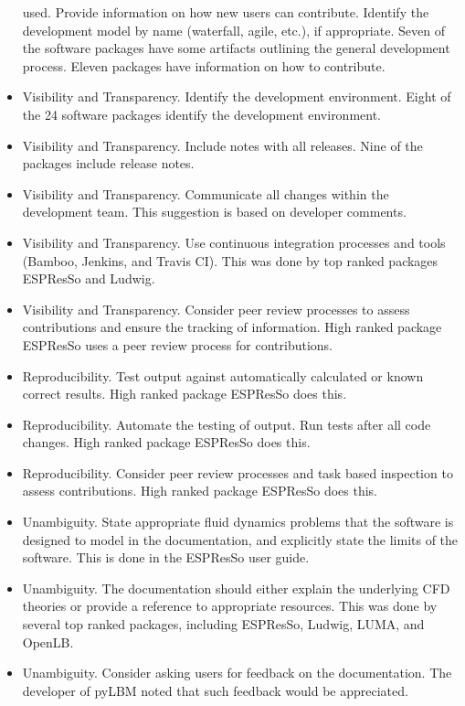 \documentclass[final, 3p, times, authoryear]{elsarticle}
\begin{document}
\begin{itemize}
	used. Provide information on how new users can contribute. Identify the
	development model by name (waterfall, agile, etc.), if appropriate.  Seven
	of the software packages have some artifacts outlining the general
	development process. Eleven packages have information on how to contribute. 
	\item Visibility and Transparency. Identify the development environment.
	Eight of the 24 software packages identify the development environment.
	\item Visibility and Transparency. Include notes with all releases. Nine of
	the packages include release notes.
	\item Visibility and Transparency. Communicate all changes within the
	development team. This suggestion is based on developer comments.
	\item Visibility and Transparency. Use continuous integration processes and
	tools (Bamboo, Jenkins, and Travis CI). This was done by top ranked packages
	ESPResSo and Ludwig.
	\item Visibility and Transparency. Consider peer review processes to assess
	contributions and ensure the tracking of information. High ranked package
	ESPResSo uses a peer review process for contributions. 
	\item Reproducibility. Test output against automatically calculated or known
	correct results. High ranked package ESPResSo does this.
	\item Reproducibility. Automate the testing of output. Run tests after all
	code changes. High ranked package ESPResSo does this.
	\item Reproducibility. Consider peer review processes and task based
	inspection to assess contributions. High ranked package ESPResSo does this.
	\item Unambiguity. State appropriate fluid dynamics problems that the
	software is designed to model in the documentation, and explicitly state the
	limits of the software. This is done in the ESPResSo user guide.
	\item Unambiguity. The documentation should either explain the underlying
	CFD theories or provide a reference to appropriate resources. This was done
	by several top ranked packages, including ESPResSo, Ludwig, LUMA, and
	OpenLB.
	\item Unambiguity. Consider asking users for feedback on the documentation.
	The developer of pyLBM noted that such feedback would be appreciated.

\end{itemize}
\end{document}
